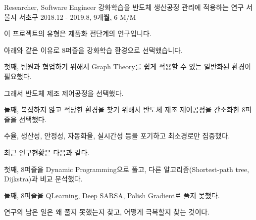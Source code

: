 \begin{cventries}
  \cventry
    {Researcher, Software Engineer} %
    {강화학습을 반도체 생산공정 관리에 적용하는 연구} %
    {서울시 서초구} %
    {2018.12 - 2019.8, 9개월, 6 M/M} %
    {
      \begin{cvitems} %
        \item {이 프로젝트의 유형은 제품화 전단계의 연구입니다.}
        \item {아래와 같은 이유로 8퍼즐을 강화학습 환경으로 선택했습니다.}
        \item {첫째, 팀원과 협업하기 위해서 Graph Theory를 쉽게 적용할 수 있는 일반화된 환경이 필요했다.}
        \item {그래서 반도체 제조 제어공정을 선택했다.}
        \item {둘째, 복잡하지 않고 적당한 환경을 찾기 위해서 반도체 제조 제어공정을 간소화한 8퍼즐을 선택했다.}
        \item {수율, 생산성, 안정성, 자동화율, 실시간성 등을 포기하고 최소경로만 집중했다.}
        \item {최근 연구현황은 다음과 같다.}
        \item {첫째, 8퍼즐을 Dynamic Programming으로 풀고, 다른 알고리즘(Shortest-path tree, Dijkstra)과 비교 분석했다.}
        \item {둘째, 8퍼즐을 QLearning, Deep SARSA, Polish Gradient로 풀지 못했다.}
        \item {연구의 남은 일은 왜 풀지 못했는지 찾고, 어떻게 극복할지 찾는 것이다.}
      \end{cvitems}
    }


\end{cventries}
